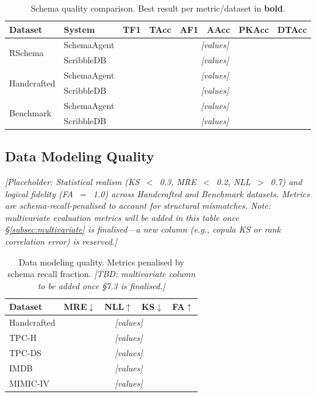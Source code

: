 \begin{table}[t]
  \caption{Schema quality comparison.
           Best result per metric/dataset in \textbf{bold}.}
  \label{tab:schema-quality}
  \centering
  \small
  \begin{tabular}{llcccccc}
    \toprule
    Dataset & System & TF1 & TAcc & AF1 & AAcc & PKAcc & DTAcc \\
    \midrule
    \multirow{2}{*}{RSchema}
      & SchemaAgent & \multicolumn{6}{c}{\textit{[values]}} \\
      & ScribbleDB  & \multicolumn{6}{c}{\textit{[values]}} \\
    \midrule
    \multirow{2}{*}{Handcrafted}
      & SchemaAgent & \multicolumn{6}{c}{\textit{[values]}} \\
      & ScribbleDB  & \multicolumn{6}{c}{\textit{[values]}} \\
    \midrule
    \multirow{2}{*}{Benchmark}
      & SchemaAgent & \multicolumn{6}{c}{\textit{[values]}} \\
      & ScribbleDB  & \multicolumn{6}{c}{\textit{[values]}} \\
    \bottomrule
  \end{tabular}
\end{table}

\subsection{Data Modeling Quality}
\label{subsec:data-quality}

\textit{[Placeholder: Statistical realism (KS~$<$~0.3, MRE~$<$~0.2, NLL~$>$~0.7) and
logical fidelity (FA~$=$~1.0) across Handcrafted and Benchmark datasets.
Metrics are schema-recall-penalised to account for structural mismatches.
Note: multivariate evaluation metrics will be added in this table once \S\ref{subsec:multivariate}
is finalised---a new column (e.g., copula KS or rank correlation error) is reserved.]}

\begin{table}[t]
  \caption{Data modeling quality. Metrics penalised by schema recall fraction.
           \textit{[TBD: multivariate column to be added once §7.3 is finalised.]}}
  \label{tab:data-quality}
  \centering
  \small
  \begin{tabular}{lcccc}
    \toprule
    Dataset & MRE$\downarrow$ & NLL$\uparrow$ & KS$\downarrow$ & FA$\uparrow$ \\
    \midrule
    Handcrafted & \multicolumn{4}{c}{\textit{[values]}} \\
    TPC-H       & \multicolumn{4}{c}{\textit{[values]}} \\
    TPC-DS      & \multicolumn{4}{c}{\textit{[values]}} \\
    IMDB        & \multicolumn{4}{c}{\textit{[values]}} \\
    MIMIC-IV    & \multicolumn{4}{c}{\textit{[values]}} \\
    \bottomrule
  \end{tabular}
\end{table}

